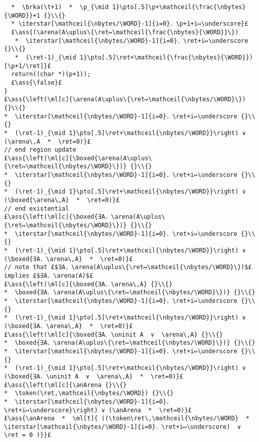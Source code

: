 \documentclass[12pt,a4paper]{article}
\makeatletter
\newcommand{\ml}[2][t]{\mbox{\mdseries\begin{tabular}[#1]{@{}L@{}}#2\end{tabular}}}
\newcommand{\ass}[1]{\ensuremath{{\color{blue}\left\{\ml[c]{#1}\right\}}}}
\newcommand{\iterstar}[2][]{\text{\LARGE $*$}^{#1}_{#2}}
\newcommand{\ret}{\texttt{ret}}
\newcommand{\arena}{\mathop{\emph{arena}}}
\newcommand{\anArena}{\emph{anArena}}
\newcommand{\token}{\mathop{\emph{token}}}
\renewcommand{\t}{{\tt t}}
\newcommand{\p}{{\tt p}}
\newcommand{\brka}{\mathop{\emph{brka}}}
\newcommand{\nbytes}{{\tt nbytes}}
\newcommand{\WORD}{{\tt WORD}}
\newcommand{\mathceil}[1]{\left\lceil#1\right\rceil}
\newcommand{\uninit}{\mathop{\emph{uninit}}}
\makeatother
\begin{document}
\begin{lstlisting}
  *  \brka(\t+1)  *  \p_{\mid 1}\pto[.5]\p+\mathceil{\frac{\nbytes}{\WORD}}+1 {}\\{} 
  * \iterstar[\mathceil{\nbytes/\WORD}-1]{i=0}．\p+1+i↦\underscore}£
  £\ass{(\arena(A\uplus\{\ret↦\mathceil{\frac{\nbytes}{\WORD}}\}) 
   *  \iterstar[\mathceil{\nbytes/\WORD}-1]{i=0}．\ret+i↦\underscore {}\\{}
   *  (\ret-1)_{\mid 1}\pto[.5]\ret+\mathceil{\frac{\nbytes}{\WORD}}) [\p+1/\ret]}£
  return((char *)(p+1));
  £\ass{\false}£
}
£\ass{\left(\ml[c]{\arena(A\uplus\{\ret↦\mathceil{\nbytes/\WORD}\}) {}\\{}
*  \iterstar[\mathceil{\nbytes/\WORD}-1]{i=0}．\ret+i↦\underscore {}\\{}
*  (\ret-1)_{\mid 1}\pto[.5]\ret+\mathceil{\nbytes/\WORD}}\right) ∨ (\arena\,A  *  \ret=0)}£
// end region update
£\ass{\left(\ml[c]{\boxed{\arena(A\uplus\{\ret↦\mathceil{\nbytes/\WORD}\})} {}\\{}
*  \iterstar[\mathceil{\nbytes/\WORD}-1]{i=0}．\ret+i↦\underscore {}\\{}
*  (\ret-1)_{\mid 1}\pto[.5]\ret+\mathceil{\nbytes/\WORD}}\right) ∨ (\boxed{\arena\,A}  *  \ret=0)}£
// end existential
£\ass{\left(\ml[c]{\boxed{∃A．\arena(A\uplus\{\ret↦\mathceil{\nbytes/\WORD}\})} {}\\{}
*  \iterstar[\mathceil{\nbytes/\WORD}-1]{i=0}．\ret+i↦\underscore {}\\{}
*  (\ret-1)_{\mid 1}\pto[.5]\ret+\mathceil{\nbytes/\WORD}}\right) ∨ (\boxed{∃A．\arena\,A}  *  \ret=0)}£
// note that £$∃A．\arena(A\uplus\{\ret↦\mathceil{\nbytes/\WORD}\})$£ implies £$∃A．\arena(A)$£
£\ass{\left(\ml[c]{\boxed{∃A．\arena\,A} {}\\{}
*  \boxed{∃A．\arena(A\uplus\{\ret↦\mathceil{\nbytes/\WORD}\})} {}\\{}
*  \iterstar[\mathceil{\nbytes/\WORD}-1]{i=0}．\ret+i↦\underscore {}\\{}
*  (\ret-1)_{\mid 1}\pto[.5]\ret+\mathceil{\nbytes/\WORD}}\right) ∨ (\boxed{∃A．\arena\,A}  *  \ret=0)}£
£\ass{\left(\ml[c]{\boxed{∃A．\uninit A  ∨  \arena\,A} {}\\{}
*  \boxed{∃A．\arena(A\uplus\{\ret↦\mathceil{\nbytes/\WORD}\})} {}\\{}
*  \iterstar[\mathceil{\nbytes/\WORD}-1]{i=0}．\ret+i↦\underscore {}\\{}
*  (\ret-1)_{\mid 1}\pto[.5]\ret+\mathceil{\nbytes/\WORD}}\right) ∨ (\boxed{∃A．\uninit A  ∨  \arena\,A}  *  \ret=0)}£
£\ass{\left(\ml[c]{\anArena {}\\{}
*  \token(\ret,\mathceil{\nbytes/\WORD}) {}\\{}
*  \iterstar[\mathceil{\nbytes/\WORD}-1]{i=0}．\ret+i↦\underscore}\right) ∨ (\anArena  *  \ret=0)}£
£\ass{\anArena  *  \ml[t]{ ((\token\ret\,\mathceil{\nbytes/\WORD}  *  \iterstar[\mathceil{\nbytes/\WORD}-1]{i=0}．\ret+i↦\underscore)  ∨  \ret = 0 )}}£
\end{lstlisting}\ \\
\end{document}
